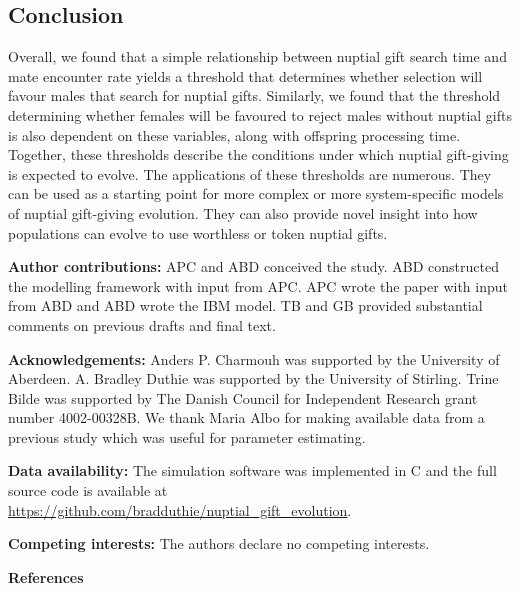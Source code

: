 \documentclass[
]{article}
\begin{document}
\hypertarget{conclusion}{%
\subsection{Conclusion}\label{conclusion}}

Overall, we found that a simple relationship between nuptial gift search
time and mate encounter rate yields a threshold that determines whether
selection will favour males that search for nuptial gifts. Similarly, we
found that the threshold determining whether females will be favoured to
reject males without nuptial gifts is also dependent on these variables,
along with offspring processing time. Together, these thresholds
describe the conditions under which nuptial gift-giving is expected to
evolve. The applications of these thresholds are numerous. They can be
used as a starting point for more complex or more system-specific models
of nuptial gift-giving evolution. They can also provide novel insight
into how populations can evolve to use worthless or token nuptial gifts.

\textbf{Author contributions:} APC and ABD conceived the study. ABD
constructed the modelling framework with input from APC. APC wrote the
paper with input from ABD and ABD wrote the IBM model. TB and GB
provided substantial comments on previous drafts and final text.

\textbf{Acknowledgements:} Anders P. Charmouh was supported by the
University of Aberdeen. A. Bradley Duthie was supported by the
University of Stirling. Trine Bilde was supported by The Danish Council
for Independent Research grant number 4002-00328B. We thank Maria Albo
for making available data from a previous study which was useful for
parameter estimating.

\textbf{Data availability:} The simulation software was implemented in C
and the full source code is available at
\url{https://github.com/bradduthie/nuptial_gift_evolution}.

\textbf{Competing interests:} The authors declare no competing
interests.

\textbf{References}
\end{document}
